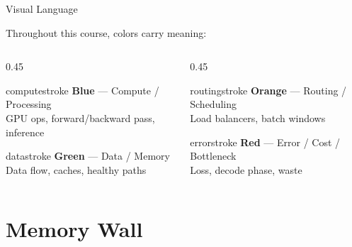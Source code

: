 \documentclass[aspectratio=169, 12pt]{beamer}
\begin{document}
\begin{frame}{Visual Language}

\small
Throughout this course, colors carry meaning:

\vspace{0.3cm}
\begin{columns}[T]
  \begin{column}{0.45\textwidth}
    \begin{mlsyscard}{computestroke}
    \textbf{Blue} --- Compute / Processing\\
    {\footnotesize GPU ops, forward/backward pass, inference}
    \end{mlsyscard}
    \vspace{0.15cm}
    \begin{mlsyscard}{datastroke}
    \textbf{Green} --- Data / Memory\\
    {\footnotesize Data flow, caches, healthy paths}
    \end{mlsyscard}
  \end{column}
  \begin{column}{0.45\textwidth}
    \begin{mlsyscard}{routingstroke}
    \textbf{Orange} --- Routing / Scheduling\\
    {\footnotesize Load balancers, batch windows}
    \end{mlsyscard}
    \vspace{0.15cm}
    \begin{mlsyscard}{errorstroke}
    \textbf{Red} --- Error / Cost / Bottleneck\\
    {\footnotesize Loss, decode phase, waste}
    \end{mlsyscard}
  \end{column}
\end{columns}
\end{frame}



\section{Memory Wall}
\end{document}
